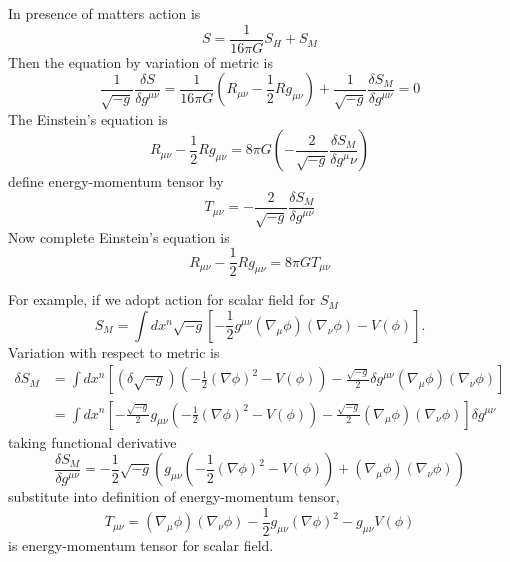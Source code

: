 \documentclass{article}
\theoremstyle{definition}
\begin{document}
In presence of matters action is
\begin{equation}
    S = \frac{1}{16 \pi G} S_H + S_M
\end{equation}
Then the equation by variation of metric is
\begin{equation}
    \frac{1}{\sqrt{-g}} \frac{\delta S}{\delta g^{\mu\nu}} = \frac{1}{16\pi G} \left( R_{\mu\nu} - \frac{1}{2} R g_{\mu\nu} \right) + \frac{1}{\sqrt{-g}} \frac{\delta S_M}{\delta g^{\mu\nu}} = 0
\end{equation}
The Einstein's equation is
\begin{equation}
    R_{\mu\nu} - \frac{1}{2} R g_{\mu\nu} = 8\pi G \left( - \frac{2}{\sqrt{-g}} \frac{\delta S_M}{\delta g^\mu\nu} \right)
\end{equation}
define energy-momentum tensor by
\begin{equation}
    T_{\mu\nu} = - \frac{2}{\sqrt{-g}} \frac{\delta S_M}{\delta g^{\mu\nu}}
\end{equation}
Now complete Einstein's equation is
\begin{equation}
    R_{\mu\nu} - \frac{1}{2} R g_{\mu\nu} = 8\pi G T_{\mu\nu} 
\end{equation}

For example, if we adopt action for scalar field for $S_M$
\begin{equation}
    S_M = \int dx^n \sqrt{-g} \left[ -\frac{1}{2} g^{\mu\nu} (\nabla_\mu \phi) (\nabla_\nu \phi) - V(\phi) \right].
\end{equation}
Variation with respect to metric is
\begin{align}
    \delta S_M &= \int dx^n \left[ (\delta \sqrt{-g}) \left( -\frac{1}{2} (\nabla \phi)^2 - V(\phi) \right) - \frac{\sqrt{-g}}{2} \delta g^{\mu\nu} (\nabla_\mu\phi) (\nabla_\nu \phi) \right] \\
               &= \int dx^n \left[ -\frac{\sqrt{-g}}{2} g_{\mu\nu} \left(-\frac{1}{2} (\nabla \phi)^2 - V(\phi) \right) - \frac{\sqrt{-g}}{2} (\nabla_\mu \phi) ( \nabla_\nu \phi) \right] \delta g^{\mu\nu}
\end{align}
taking functional derivative
\begin{equation}
    \frac{\delta S_M}{\delta g^{\mu\nu}} = -\frac{1}{2}\sqrt{-g}\left( g_{\mu\nu} \left(-\frac{1}{2} (\nabla \phi)^2 - V(\phi) \right) + (\nabla_\mu \phi) ( \nabla_\nu \phi) \right)
\end{equation}
substitute into definition of energy-momentum tensor,
\begin{equation}
    T_{\mu\nu} = (\nabla_\mu \phi) (\nabla_\nu\phi) - \frac{1}{2}  g_{\mu\nu} (\nabla \phi)^2 - g_{\mu\nu} V(\phi) 
\end{equation}
is energy-momentum tensor for scalar field.
\end{document}
